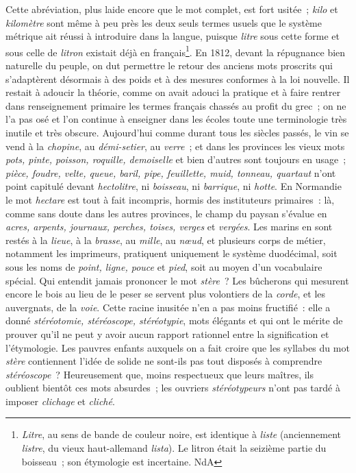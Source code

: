 \documentclass[french,twoside]{book} %
\begin{document}
Cette abréviation, plus laide encore que le mot complet, est fort usitée ; {\itshape kilo} et {\itshape kilomètre} sont même à peu près les deux seuls termes usuels que le système métrique ait réussi à introduire dans la langue, puisque {\itshape litre} sous cette forme et sous celle de {\itshape litron} existait déjà en français\footnote{{\itshape Litre}, au sens de bande de couleur noire, est identique à {\itshape liste} (anciennement {\itshape listre}, du vieux haut-allemand {\itshape lista}). Le litron était la seizième partie du boisseau ; son étymologie est incertaine. NdA}. En 1812, devant la répugnance bien naturelle du peuple, on dut permettre le retour des anciens mots proscrits qui s’adaptèrent désormais à des poids et à des mesures conformes à la loi nouvelle. Il restait à adoucir la théorie, comme on avait adouci la pratique et à faire rentrer dans renseignement primaire les termes français chassés au profit du grec ; on ne l’a pas osé et l’on continue à enseigner dans les écoles toute une terminologie très inutile et très obscure. Aujourd’hui comme durant tous les siècles passés, le vin se vend à la {\itshape chopine}, au {\itshape démi-setier}, au {\itshape verre} ; et dans les provinces les vieux mots {\itshape pots, pinte, poisson, roquille, demoiselle} et bien d’autres sont toujours en usage ; {\itshape pièce, foudre, velte, queue, baril, pipe, feuillette, muid, tonneau, quartaut} n’ont point capitulé devant {\itshape hectolitre}, ni {\itshape boisseau}, ni {\itshape barrique}, ni {\itshape hotte}. En Normandie le mot {\itshape hectare} est tout à fait incompris, hormis des instituteurs primaires : là, comme sans doute dans les autres provinces, le champ du paysan s’évalue en {\itshape acres, arpents, journaux, perches, toises, verges} et {\itshape vergées}. Les marins en sont restés à la {\itshape lieue}, à la {\itshape brasse}, au {\itshape mille}, au {\itshape nœud}, et plusieurs corps de métier, notamment les imprimeurs, pratiquent uniquement le système duodécimal, soit sous les noms de {\itshape point, ligne, pouce} et {\itshape pied}, soit au moyen d’un vocabulaire spécial. Qui entendit jamais prononcer le mot {\itshape stère} ? Les bûcherons qui mesurent encore le bois au lieu de le peser se servent plus volontiers de la {\itshape corde}, et les auvergnats, de la {\itshape voie}. Cette racine inusitée n’en a pas moins fructifié : elle a donné {\itshape stéréotomie, stéréoscope, stéréotypie}, mots élégants et qui ont le mérite de prouver qu’il ne peut y avoir aucun rapport rationnel entre la signification et l’étymologie. Les pauvres enfants auxquels on a fait croire que les syllabes du mot {\itshape stère} contiennent l’idée de solide ne sont-ils pas tout disposés à comprendre {\itshape stéréoscope} ? Heureusement que, moins respectueux que leurs maîtres, ils oublient bientôt ces mots absurdes ; les ouvriers {\itshape stéréotypeurs} n’ont pas tardé à imposer {\itshape clichage} et {\itshape cliché}.\par
\end{document}
